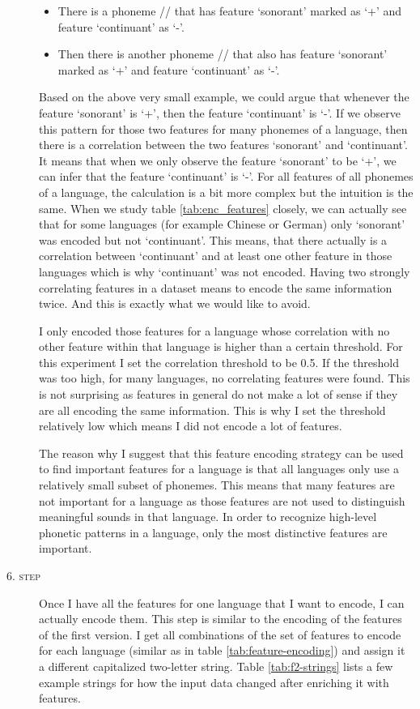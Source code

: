 \begin{description}
    \begin{itemize}
        \item There is a phoneme // that has feature `sonorant' marked as `+' and feature `continuant' as `-'.
        \item Then there is another phoneme // that also has feature `sonorant' marked as `+' and feature `continuant' as `-'.
    \end{itemize}
    Based on the above very small example, we could argue that whenever the feature `sonorant' is `+', then the feature `continuant' is `-'. If we observe this pattern for those two features for many phonemes of a language, then there is a correlation between the two features `sonorant' and `continuant'. It means that when we only observe the feature `sonorant' to be `+', we can infer that the  feature `continuant' is `-'. For all features of all phonemes of a language, the calculation is a bit more complex but the intuition is the same. When we study table \ref{tab:enc_features} closely, we can actually see that for some languages (for example Chinese or German) only `sonorant' was encoded but not `continuant'. This means, that there actually is a correlation between `continuant' and at least one other feature in those languages which is why `continuant' was not encoded. Having two strongly correlating features in a dataset means to encode the same information twice. And this is exactly what we would like to avoid.
    
    I only encoded those features for a language whose correlation with no other feature within that language is higher than a certain threshold. For this experiment I set the correlation threshold to be 0.5. If the threshold was too high, for many languages, no correlating features were found. This is not surprising as features in general do not make a lot of sense if they are all encoding the same information. This is why I set the threshold relatively low which means I did not encode a lot of features. 
    
    The reason why I suggest that this feature encoding strategy can be used to find important features for a language is that all languages only use a relatively small subset of phonemes. This means that many features are not important for a language as those features are not used to distinguish meaningful sounds in that language. In order to recognize high-level phonetic patterns in a language, only the most distinctive features are important. 
    
    \item[\textsc{6. step}] Once I have all the features for one language that I want to encode, I can actually encode them. This step is similar to the encoding of the features of the first version. I get all combinations of the set of features to encode for each language (similar as in table \ref{tab:feature-encoding}) and assign it a different capitalized two-letter string. Table \ref{tab:f2-strings} lists a few example strings for how the input data changed after enriching it with features.  
\end{description}

